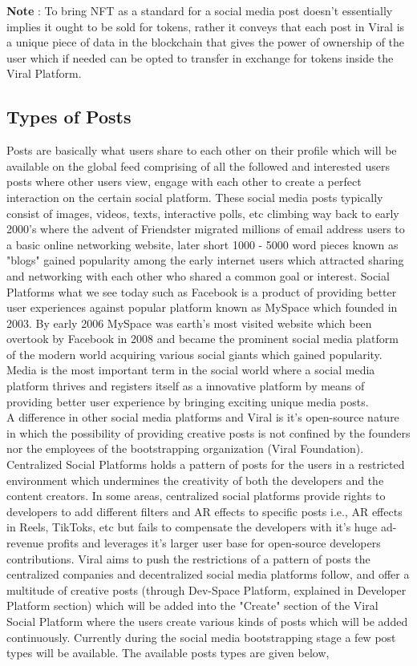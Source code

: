 \documentclass[conference]{IEEEtran}
\begin{document}
\textbf{Note} : To bring NFT as a standard for a social media post doesn't essentially implies it ought to be sold for tokens, rather it conveys that each post in Viral is a unique piece of data in the blockchain that gives the power of ownership of the user which if needed can be opted to transfer in exchange for tokens inside the Viral Platform.

\subsection{\textbf{Types of Posts}}

Posts are basically what users share to each other on their profile which will be available on the global feed comprising of all the followed and interested users posts where other users view, engage with each other to create a perfect interaction on the certain social platform. These social media posts typically consist of images, videos, texts, interactive polls, etc climbing way back to early 2000's where the advent of Friendster migrated millions of email address users to a basic online networking website, later short 1000 - 5000 word pieces known as "blogs" gained popularity among the early internet users which attracted sharing and networking with each other who shared a common goal or interest. Social Platforms what we see today such as Facebook is a product of providing better user experiences against popular platform known as MySpace which founded in 2003. By early 2006 MySpace was earth's most visited website which been overtook by Facebook in 2008 and became the prominent social media platform of the modern world acquiring various social giants which gained popularity. Media is the most important term in the social world where a social media platform thrives and registers itself as a innovative platform by means of providing better user experience by bringing exciting unique media posts.\\

A difference in other social media platforms and Viral is it's open-source nature in which the possibility of providing creative posts is not confined by the founders nor the employees of the bootstrapping organization (Viral Foundation). Centralized Social Platforms holds a pattern of posts for the users in a restricted environment which undermines the creativity of both the developers and the content creators. In some areas, centralized social platforms provide rights to developers to add different filters and AR effects to specific posts i.e., AR effects in Reels, TikToks, etc but fails to compensate the developers with it's huge ad-revenue profits and  leverages it's larger user base for open-source developers contributions. Viral aims to push the restrictions of a pattern of posts the centralized companies and decentralized social media platforms follow, and offer a multitude of creative posts (through Dev-Space Platform, explained in Developer Platform section) which will be added into the "Create" section of the Viral Social Platform where the users create various kinds of posts which will be added continuously. Currently during the social media bootstrapping stage a few post types will be available. The available posts types are given below, \\ 
\end{document}
